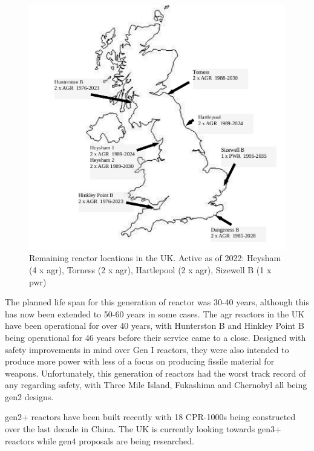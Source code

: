 \begin{figure}[tbp]
  \begin{center}
    \includegraphics[width=12.0cm]{chapters/introduction/images/remaining_plants.png}
    \caption{Remaining reactor locations in the UK.  Active as of 2022: Heysham (4 x \acrshort{agr}), Torness (2 x \acrshort{agr}), Hartlepool (2 x \acrshort{agr}), Sizewell B (1 x \acrshort{pwr})}
    \label{fig:remainingreactorsuk}
  \end{center}
\end{figure}

The planned life span for this generation of reactor was 30-40 years, although this has now been extended to 50-60 years in some cases.  The \acrshort{agr} reactors in the UK have been operational for over 40 years, with Hunterston B and Hinkley Point B being operational for 46 years before their service came to a close.  Designed with safety improvements in mind over Gen I reactors, they were also intended to produce more power with less of a focus on producing fissile material for weapons.  Unfortunately, this generation of reactors had the worst track record of any regarding safety, with Three Mile Island, Fukashima and Chernobyl all being \acrshort{gen2} designs.

\acrshort{gen2+} reactors have been built recently with 18 CPR-1000s being constructed over the last decade in China.  The UK is currently looking towards \acrshort{gen3+} reactors while \acrshort{gen4} proposals are being researched.   


